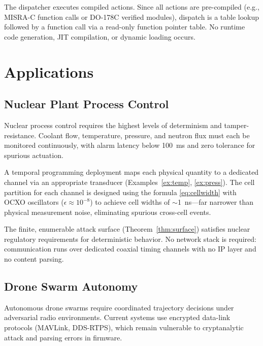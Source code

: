 \documentclass[twocolumn,10pt]{article}
\begin{document}
The dispatcher executes compiled actions. Since all actions are
pre-compiled (e.g., MISRA-C \cite{misrac2012} function calls or
DO-178C \cite{do178c} verified modules), dispatch is a table
lookup followed by a function call via a read-only function pointer
table. No runtime code generation, JIT compilation, or dynamic
loading occurs.

\section{Applications}
\label{sec:apps}

\subsection{Nuclear Plant Process Control}

Nuclear process control requires the highest levels of determinism
and tamper-resistance. Coolant flow, temperature, pressure, and
neutron flux must each be monitored continuously, with alarm latency
below 100~ms and zero tolerance for spurious actuation.

A temporal programming deployment maps each physical quantity to a
dedicated channel via an appropriate transducer
(Examples~\ref{ex:temp}, \ref{ex:press}). The cell partition for
each channel is designed using the formula \eqref{eq:cellwidth}
with OCXO oscillators ($\epsilon \approx 10^{-8}$) to achieve
cell widths of $\sim$1~ns---far narrower than physical measurement
noise, eliminating spurious cross-cell events.

The finite, enumerable attack surface (Theorem~\ref{thm:surface})
satisfies nuclear regulatory requirements for deterministic behavior.
No network stack is required: communication runs over dedicated
coaxial timing channels with no IP layer and no content parsing.

\subsection{Drone Swarm Autonomy}

Autonomous drone swarms require coordinated trajectory decisions
under adversarial radio environments. Current systems use encrypted
data-link protocols (MAVLink, DDS-RTPS), which remain vulnerable
to cryptanalytic attack and parsing errors in firmware.
\end{document}
